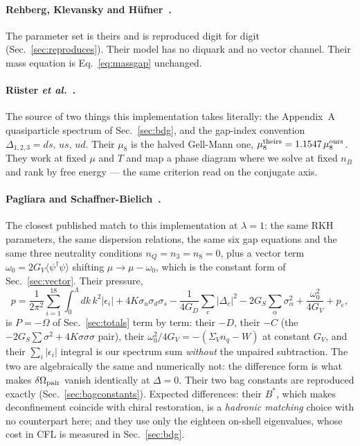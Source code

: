 \documentclass[aps,prc,onecolumn,superscriptaddress,nofootinbib,10pt]{revtex4-2}
\newcommand{\nB}{n_B}
\newcommand{\nq}{n_q}
\newcommand{\Lam}{\Lambda}
\newcommand{\GS}{G_S}
\newcommand{\GD}{G_D}
\newcommand{\GV}{G_V}
\begin{document}
\paragraph{Rehberg, Klevansky and H\"ufner~\cite{Rehberg1996}.} The parameter
set is theirs and is reproduced digit for digit
(Sec.~\ref{sec:reproduces}). Their model has no diquark and no vector channel.
Their mass equation is Eq.~\eqref{eq:massgap} unchanged.

\paragraph{R\"uster \textit{et al.}~\cite{Ruester2005}.} The source of two
things this implementation takes literally: the Appendix~A quasiparticle
spectrum of Sec.~\ref{sec:bdg}, and the gap-index convention
$\Delta_{1,2,3} = ds,\,us,\,ud$. Their $\mu_8$ is the halved Gell-Mann one,
$\mu_8^{\rm theirs} = 1.1547\,\mu_8^{\rm ours}$. They work at fixed $\mu$ and
$T$ and map a phase diagram where we solve at fixed $\nB$ and rank by free
energy --- the same criterion read on the conjugate axis.

\paragraph{Pagliara and Schaffner-Bielich~\cite{Pagliara2008}.} The closest
published match to this implementation at $\lambda = 1$: the same RKH
parameters, the same dispersion relations, the same six gap equations and the
same three neutrality conditions $n_Q = n_3 = n_8 = 0$, plus a vector term
$\omega_0 = 2\GV\langle\psi^\dagger\psi\rangle$ shifting
$\mu \to \mu - \omega_0$, which is the constant form of
Sec.~\ref{sec:vector}. Their pressure,
\begin{equation}
  p = \frac{1}{2\pi^2}\sum_{i=1}^{18}\int_0^{\Lam}\!\! dk\,k^2|\epsilon_i|
    + 4K\sigma_u\sigma_d\sigma_s - \frac{1}{4\GD}\sum_c |\Delta_c|^2
    - 2\GS\sum_\alpha \sigma_\alpha^2 + \frac{\omega_0^2}{4\GV} + p_e ,
\end{equation}
is $P = -\Omega$ of Sec.~\ref{sec:totals} term by term: their $-D$, their $-C$
(the $-2\GS\sum\sigma^2 + 4K\sigma\sigma\sigma$ pair), their
$\omega_0^2/4\GV = -(\Sigma_V \nq - W)$ at constant $\GV$, and their
$\sum_i|\epsilon_i|$ integral is our spectrum sum \emph{without} the unpaired
subtraction. The two are algebraically the same and numerically not: the
difference form is what makes $\delta\Omega_{\rm pair}$ vanish identically at
$\Delta = 0$. Their two bag constants are reproduced exactly
(Sec.~\ref{sec:bagconstants}). Expected differences: their $B^{*}$, which makes
deconfinement coincide with chiral restoration, is a \emph{hadronic matching}
choice with no counterpart here; and they use only the eighteen on-shell
eigenvalues, whose cost in CFL is measured in Sec.~\ref{sec:bdg}.
\end{document}
